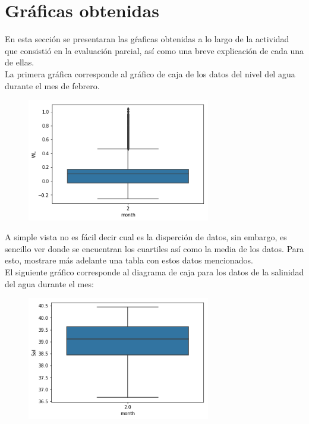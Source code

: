 \documentclass{article}
\begin{document}
\section{Gráficas obtenidas}
En esta sección se presentaran las gŕaficas obtenidas a lo largo de la actividad que consistió en la evaluación parcial, así como una breve explicación de cada una de ellas. \\
La primera gráfica corresponde al gráfico de caja de los datos del nivel del agua durante el mes de febrero.
\begin{figure}[htb]
    \begin{center}
    \includegraphics[width=8cm]{BPNivelA.png}
    \end{center}
\end{figure}    
A simple vista no es fácil decir cual es la disperción de datos, sin embargo, es sencillo ver donde se encuentran los cuartiles así como la media de los datos. Para esto, mostrare más adelante una tabla con estos datos mencionados. \\
El siguiente gráfico corresponde al diagrama de caja para los datos de la salinidad del agua durante el mes: \\
\begin{figure}[htb]
    \begin{center}
    \includegraphics[width=8cm]{BPSalinidad.png}
    \end{center}
\end{figure}    
\end{document}
